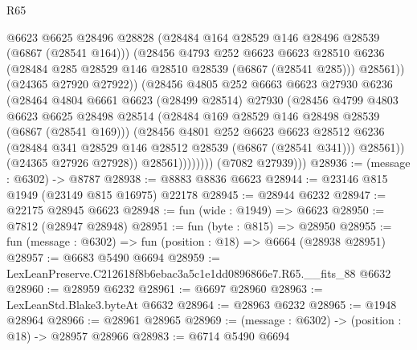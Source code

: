 \begin{lexlean}{R65}
\begin{coremodule}
{                          @6623
                          @6625
                          @28496
                          @28828
                          (@28484 @164 @28529 @146 @28496 @28539 (@6867 (@28541 @164)))
                          (@28456
                            @4793
                            @252
                            @6623
                            @6623
                            @28510
                            @6236
                            (@28484 @285 @28529 @146 @28510 @28539 (@6867 (@28541 @285)))
                            @28561))
                        (@24365 @27920 @27922))
                      (@28456
                        @4805
                        @252
                        @6663
                        @6623
                        @27930
                        @6236
                        (@28464
                          @4804
                          @6661
                          @6623
                          (@28499 @28514)
                          @27930
                          (@28456
                            @4799
                            @4803
                            @6623
                            @6625
                            @28498
                            @28514
                            (@28484 @169 @28529 @146 @28498 @28539 (@6867 (@28541 @169)))
                            (@28456
                              @4801
                              @252
                              @6623
                              @6623
                              @28512
                              @6236
                              (@28484 @341 @28529 @146 @28512 @28539 (@6867 (@28541 @341)))
                              @28561))
                          (@24365 @27926 @27928))
                        @28561))))))))
        (@7082 @27939)))
@28936 := (message : @6302) -> @8787
@28938 := @8883 @8836 @6623
@28944 := @23146 @815 @1949 (@23149 @815 @16975) @22178
@28945 := @28944 @6232
@28947 := @22175 @28945 @6623
@28948 := fun (wide : @1949) => @6623
@28950 := @7812 (@28947 @28948)
@28951 := fun (byte : @815) => @28950
@28955 := fun (message : @6302) => fun (position : @18) => @6664 (@28938 @28951)
@28957 := @6683 @5490 @6694
@28959 := LexLeanPreserve.C212618f8b6ebac3a5c1e1dd0896866e7.R65.__fits_88 @6632
@28960 := @28959 @6232
@28961 := @6697 @28960
@28963 := LexLeanStd.Blake3.byteAt @6632
@28964 := @28963 @6232
@28965 := @1948 @28964
@28966 := @28961 @28965
@28969 := (message : @6302) -> (position : @18) -> @28957 @28966
@28983 := @6714
    @5490
    @6694
}
\end{coremodule}
\end{lexlean}

